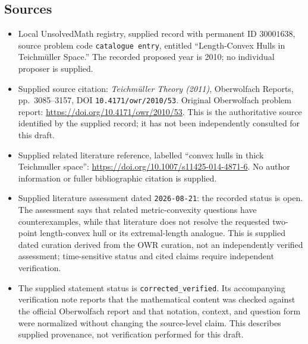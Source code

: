 \documentclass[11pt]{article}
\begin{document}
\subsection{Sources}
\begin{itemize}
\item Local UnsolvedMath registry, supplied record with permanent ID \(30001638\), source problem code \texttt{catalogue entry}, entitled ``Length-Convex Hulls in Teichm\"uller Space.'' The recorded proposed year is 2010; no individual proposer is supplied.
\item Supplied source citation: \emph{Teichm\"uller Theory (2011)}, Oberwolfach Reports, pp.\ 3085--3157, DOI \texttt{10.4171/owr/2010/53}. Original Oberwolfach problem report: \url{https://doi.org/10.4171/owr/2010/53}. This is the authoritative source identified by the supplied record; it has not been independently consulted for this draft.
\item Supplied related literature reference, labelled ``convex hulls in thick Teichmuller space'': \url{https://doi.org/10.1007/s11425-014-4871-6}. No author information or fuller bibliographic citation is supplied.
\item Supplied literature assessment dated \texttt{2026-08-21}: the recorded status is open. The assessment says that related metric-convexity questions have counterexamples, while that literature does not resolve the requested two-point length-convex hull or its extremal-length analogue. This is supplied dated curation derived from the OWR curation, not an independently verified assessment; time-sensitive status and cited claims require independent verification.
\item The supplied statement status is \texttt{corrected\_verified}. Its accompanying verification note reports that the mathematical content was checked against the official Oberwolfach report and that notation, context, and question form were normalized without changing the source-level claim. This describes supplied provenance, not verification performed for this draft.
\end{itemize}
\end{document}
